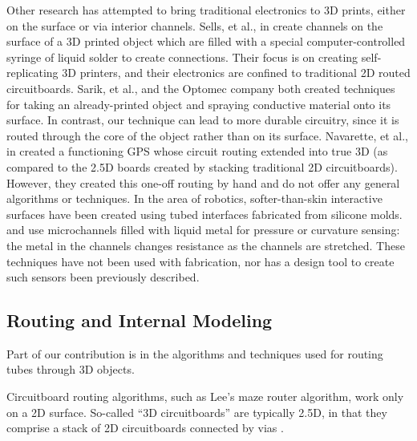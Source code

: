 Other research has attempted to bring traditional electronics to 3D prints, either on the surface or via interior channels.  Sells, et al., in \cite{Sells-reprap} create channels on the surface of a 3D printed object which are filled with a special computer-controlled syringe of liquid solder to create connections.  Their focus is on creating self-replicating 3D printers, and their electronics are confined to traditional 2D routed circuitboards.  Sarik, et al., \cite{Sarik-tracebrush}  and the Optomec company \cite{optomec} both created techniques for taking an already-printed object and spraying conductive material onto its surface.  In contrast, our technique can lead to more durable circuitry, since it is routed through the core of the object rather than on its surface.  Navarette, et al., in \cite{Navarrette-gps} created a functioning GPS whose circuit routing extended into true 3D (as compared to the 2.5D boards created by stacking traditional 2D circuitboards).  However, they created this one-off routing by hand and do not offer any general algorithms or techniques.  In the area of robotics, softer-than-skin interactive surfaces have been created using tubed interfaces fabricated from silicone molds.  \cite{Park-microchannels} and \cite{Majidi-curvature} use microchannels filled with liquid metal for pressure or curvature sensing: the metal in the channels changes resistance as the channels are stretched.  These techniques have not been used with fabrication, nor has a design tool to create such sensors been previously described.

\subsection{Routing and Internal Modeling}

Part of our contribution is in the algorithms and techniques used for routing tubes through 3D objects.

Circuitboard routing algorithms, such as Lee's maze router algorithm, work only on a 2D surface.  So-called ``3D circuitboards'' are typically 2.5D, in that they comprise a stack of 2D circuitboards connected by vias .

